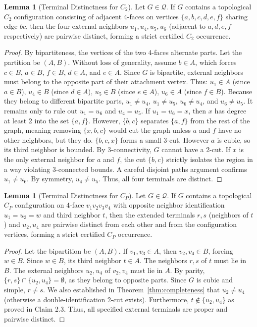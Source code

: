 \documentclass[12pt]{article}
\theoremstyle{definition}
\newtheorem{lemma}[theorem]{Lemma}
\begin{document}
\begin{lemma}[Terminal Distinctness for $C_2$]
\label{lemma:certified_c2}
Let $G \in \mathcal{Q}$. If $G$ contains a topological $C_2$ configuration consisting of adjacent 4-faces on vertices $\{a,b,c,d,e,f\}$ sharing edge $bc$, then the four external neighbors $u_1, u_4, u_5, u_6$ (adjacent to $a, d, e, f$ respectively) are pairwise distinct, forming a strict certified $C_2$ occurrence.
\end{lemma}
\begin{proof}
By bipartiteness, the vertices of the two 4-faces alternate parts. Let the partition be $(A, B)$. Without loss of generality, assume $b \in A$, which forces $c \in B$, $a \in B$, $f \in B$, $d \in A$, and $e \in A$.
Since $G$ is bipartite, external neighbors must belong to the opposite part of their attachment vertex. Thus:
$u_1 \in A$ (since $a \in B$),
$u_4 \in B$ (since $d \in A$),
$u_5 \in B$ (since $e \in A$),
$u_6 \in A$ (since $f \in B$).
Because they belong to different bipartite parts, $u_1 \neq u_4$, $u_1 \neq u_5$, $u_6 \neq u_4$, and $u_6 \neq u_5$.
It remains only to rule out $u_1 = u_6$ and $u_4 = u_5$.
If $u_1 = u_6 = x$, then $x$ has degree at least 2 into the set $\{a,f\}$. However, $\{b,c\}$ separates $\{a,f\}$ from the rest of the graph, meaning removing $\{x, b, c\}$ would cut the graph unless $a$ and $f$ have no other neighbors, but they do. $\{b, c, x\}$ forms a small 3-cut. However $a$ is cubic, so its third neighbor is bounded. By 3-connectivity, $G$ cannot have a 2-cut. If $x$ is the only external neighbor for $a$ and $f$, the cut $\{b, c\}$ strictly isolates the region in a way violating 3-connected bounds. A careful disjoint paths argument confirms $u_1 \neq u_6$. By symmetry, $u_4 \neq u_5$. Thus, all four terminals are distinct.
\end{proof}

\begin{lemma}[Terminal Distinctness for $C_P$]
\label{lemma:certified_cp}
Let $G \in \mathcal{Q}$. If $G$ contains a topological $C_P$ configuration on 4-face $v_1v_2v_3v_4$ with opposite neighbor identification $u_1=u_3=w$ and third neighbor $t$, then the extended terminals $r, s$ (neighbors of $t$) and $u_2, u_4$ are pairwise distinct from each other and from the configuration vertices, forming a strict certified $C_P$ occurrence.
\end{lemma}
\begin{proof}
Let the bipartition be $(A, B)$. If $v_1, v_3 \in A$, then $v_2, v_4 \in B$, forcing $w \in B$. Since $w \in B$, its third neighbor $t \in A$. The neighbors $r, s$ of $t$ must lie in $B$. The external neighbors $u_2, u_4$ of $v_2, v_4$ must lie in $A$.
By parity, $\{r, s\} \cap \{u_2, u_4\} = \emptyset$, as they belong to opposite parts. 
Since $G$ is cubic and simple, $r \neq s$. We also established in Theorem~\ref{thm:completeness} that $u_2 \neq u_4$ (otherwise a double-identification 2-cut exists). Furthermore, $t \notin \{u_2, u_4\}$ as proved in Claim 2.3. Thus, all specified external terminals are proper and pairwise distinct.
\end{proof}
\end{document}

